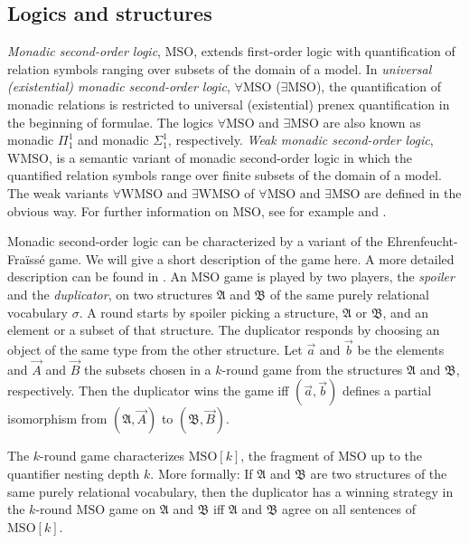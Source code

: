 \documentclass{LMCS}
\theoremstyle{plain}
\newcommand{\mf}{\mathfrak}
\begin{document}
\subsection{Logics and structures}\label{logics and structures}



\emph{Monadic second-order logic}, $\mathrm{MSO}$,
%
extends first-order logic with
%
quantification of
%
relation symbols ranging over subsets of the domain of a model.
%
In \emph{universal (existential) monadic second-order logic}, $\forall \mathrm{MSO}$ ($\exists \mathrm{MSO}$),
%
the quantification of monadic relations is restricted to universal (existential)
%
prenex quantification in the beginning of formulae.
%
The logics $\forall \mathrm{MSO}$ and $\exists \mathrm{MSO}$ are also known as monadic $\Pi_1^1$ and monadic $\Sigma_1^1$, respectively.
%
\emph{Weak monadic second-order logic}, $\mathrm{WMSO}$, is a semantic variant of
%
monadic second-order logic in which the quantified relation symbols range over
%
finite subsets of the domain of a model.
%
The weak variants $\forall \mathrm{WMSO}$
%
and $\exists \mathrm{WMSO}$ of $\forall \mathrm{MSO}$ and $\exists\mathrm{MSO}$ are
%
defined in the obvious way. For further information on $\mathrm{MSO}$, see for example 
%
\cite{gure1} and \cite{Libkin}.
%

%
Monadic second-order logic can be characterized by a variant of the Ehrenfeucht-Fra\"{i}ss\'{e} game.
We will give a short description of the game here. A more detailed description can be found in \cite{Libkin}.
%
An $\mathrm{MSO}$ game is played by two players, the \emph{spoiler} and the \emph{duplicator},
on two structures $\mf{A}$ and $\mf{B}$ of the
same purely relational vocabulary $\sigma$.
A round starts by spoiler picking a structure, $\mf{A}$ or $\mf{B}$, and an element or a subset of that
structure. The duplicator responds by choosing an object of the same type from the
other structure. Let $\vec{a}$ and $\vec{b}$ be the elements and $\vec{A}$ and $\vec{B}$ the
subsets chosen in a $k$-round game from the structures $\mf{A}$ and $\mf{B}$, respectively. Then the
duplicator wins the game iff $(\vec{a},\vec{b})$
defines a partial isomorphism from $(\mf{A},\vec{A})$ to $(\mf{B},\vec{B})$.

The $k$-round game characterizes $\mathrm{MSO}[k]$,
the fragment of $\mathrm{MSO}$ up to the quantifier nesting depth $k$.
More formally: If $\mf{A}$ and $\mf{B}$ are two
structures of the same purely relational vocabulary, then the duplicator has a winning
strategy in the $k$-round $\mathrm{MSO}$ game on $\mf{A}$ and $\mf{B}$ iff $\mf{A}$ and $\mf{B}$
agree on all sentences of $\mathrm{MSO}[k]$.
%
%
\end{document}
